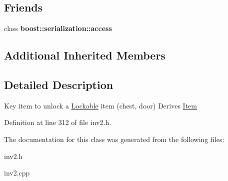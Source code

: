 \subsection*{Friends}
\begin{DoxyCompactItemize}
\item 
\hypertarget{class_key_item_ac98d07dd8f7b70e16ccb9a01abf56b9c}{}\label{class_key_item_ac98d07dd8f7b70e16ccb9a01abf56b9c} 
class {\bfseries boost\+::serialization\+::access}
\end{DoxyCompactItemize}
\subsection*{Additional Inherited Members}


\subsection{Detailed Description}
Key item to unlock a \hyperlink{class_lockable}{Lockable} item (chest, door) Derives \hyperlink{class_item}{Item} 

Definition at line 312 of file inv2.\+h.



The documentation for this class was generated from the following files\+:\begin{DoxyCompactItemize}
\item 
inv2.\+h\item 
inv2.\+cpp\end{DoxyCompactItemize}

